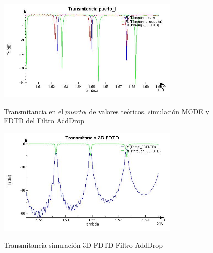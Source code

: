 \begin{figure}[H]
\caption{Transmitancia en el $puerto_t$ de valores teóricos, simulación MODE y 
FDTD del Filtro AddDrop}
\centering
\includegraphics[width=0.8\textwidth,natwidth=632,natheight=356]{figs/lum_Tt.jpg}
\label{fig:lum_tt_ad}
\end{figure} 

\begin{figure}[H]
\caption{Transmitancia simulación 3D FDTD Filtro AddDrop}
\centering
\includegraphics[width=0.8\textwidth,natwidth=598,natheight=356]{figs/lum_T_FDTD.jpg}
\label{fig:lum_t_fdtd_ad}
\end{figure} 

